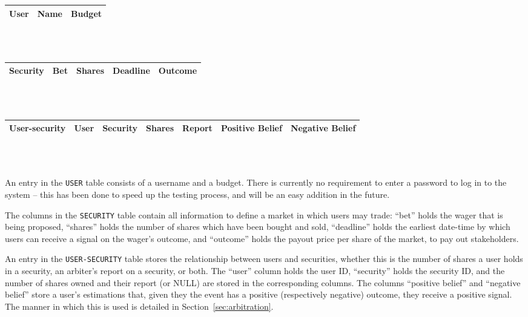\documentclass[10pt,a4paper]{article}
\theoremstyle{plain}
\theoremstyle{definition}
\newcommand{\code}[1]{\texttt{#1}}
\begin{document}
\begin{table}[ht]
	\centering
	\begin{tabular}{|c|c|c|}
		\hline
		\textbf{User} & Name & Budget \\ \hline
	\end{tabular} \\~\\

	\begin{tabular}{|c|c|c|c|c|}
		\hline
		\textbf{Security} & Bet & Shares & Deadline & Outcome \\ \hline
	\end{tabular} \\~\\

	\begin{tabular}{|c|c|c|c|c|c|c|}
		\hline
		\textbf{User-security} & User & Security & Shares & Report & Positive Belief & Negative Belief \\ \hline
	\end{tabular} \\~\\
\end{table}

An entry in the \code{USER} table consists of a username and a budget. There is
currently no requirement to enter a password to log in to the system -- this
has been done to speed up the testing process, and will be an easy addition in
the future.

The columns in the \code{SECURITY} table contain all information to define a
market in which users may trade: ``bet'' holds the wager that is being
proposed, ``shares'' holds the number of shares which have been bought and
sold, ``deadline'' holds the earliest date-time by which users can receive a
signal on the wager's outcome, and ``outcome'' holds the payout price per share
of the market, to pay out stakeholders.

An entry in the \code{USER-SECURITY} table stores the relationship between
users and securities, whether this is the number of shares a user holds in a
security, an arbiter's report on a security, or both. The ``user'' column
holds the user ID, ``security'' holds the security ID, and the number of shares
owned and their report (or NULL) are stored in the corresponding columns. The
columns ``positive belief'' and ``negative belief'' store a user's estimations
that, given they the event has a positive (respectively negative) outcome, they
receive a positive signal. The manner in which this is used is detailed in
Section~\ref{sec:arbitration}.
\end{document}
